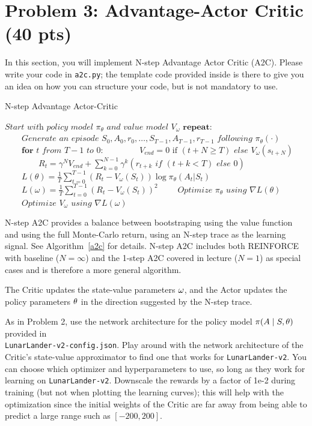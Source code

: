 \documentclass[12pt]{article}
\begin{document}
\section*{Problem 3: Advantage-Actor Critic (40 pts)}

In this section, you will implement N-step Advantage Actor Critic (A2C). Please write your code in \texttt{a2c.py}; the template code provided inside is there to give you an idea on how you can structure your code, but is not mandatory to use.

\begin{algorithm}
\label{alga2c}
\caption{N-step Advantage Actor-Critic\label{a2c}}
\begin{algorithmic}[1]
\State $\textit{Start with policy model } \pi_\theta \textit{ and value model } V_\omega$
\State $\textbf{repeat:}$
\State $\qquad\textit{Generate an episode } S_0, A_0, r_0, \ldots, S_{T-1}, A_{T-1}, r_{T-1} \textit{ following } \pi_\theta(\cdot)$
\State $\qquad\textbf{for } t \textit{ from } T-1 \textit{ to } 0$:
\State $\qquad\qquad V_{end} = 0 \text{ if } (t+N \geq T) \textit{ else } V_\omega(s_{t+N})$
\State $\qquad\qquad R_t = \gamma^{N} V_{end} + \sum_{k=0}^{N-1} \gamma^k \left(r_{t+k} \textit{ if } (t+k < T) \textit{ else } 0\right)$ 
\State $\qquad L(\theta) = \frac{1}{T} \sum_{t=0}^{T-1} (R_t - V_\omega(S_t)) \log \pi_\theta(A_t | S_t)$
\State $\qquad L(\omega) = \frac{1}{T} \sum_{t=0}^{T-1} (R_t - V_\omega(S_t))^2$
\State $\qquad\textit{Optimize } \pi_\theta \textit{ using } \nabla L(\theta)$
\State $\qquad\textit{Optimize } V_\omega \textit{ using } \nabla L(\omega)$
\EndProcedure
\end{algorithmic}
\end{algorithm}

N-step A2C provides a balance between bootstraping using the value function and using the full Monte-Carlo return, using an N-step trace as the learning signal. See Algorithm~\ref{a2c} for details. N-step A2C includes both REINFORCE with baseline ($N=\infty$) and the 1-step A2C covered in lecture ($N=1$) as special cases and is therefore a more general algorithm.

The Critic updates the state-value parameters $\bf{\omega}$, and the Actor updates the policy parameters $\bf{\theta}$ in the direction suggested by the N-step trace. 

As in Problem 2, use the network architecture for the policy model $\pi(A \mid S, \bf{\theta})$ provided in \\\texttt{LunarLander-v2-config.json}. Play around with the network architecture of the Critic's state-value approximator to find one that works for \texttt{LunarLander-v2}. You can choose which optimizer and hyperparameters to use, so long as they work for learning on \texttt{LunarLander-v2}. Downscale the rewards by a factor of 1e-2 during training (but not when plotting the learning curves); this will help with the optimization since the initial weights of the Critic are far away from being able to predict a large range such as $[-200, 200]$.
\end{document}
